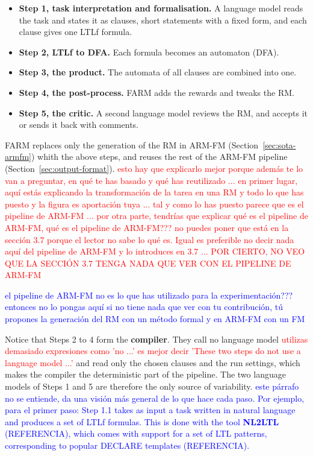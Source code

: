 \documentclass[11pt,english,listoffigures,listoftables]{tfgetsinf}
\begin{document}
\begin{itemize}
    \item \textbf{Step 1, task interpretation and formalisation.} A language model reads the task and states it as clauses, short statements with a fixed form, and each clause gives one LTLf formula.
    \item \textbf{Step 2, LTLf to DFA.} Each formula becomes an automaton (DFA).
    \item \textbf{Step 3, the product.} The automata of all clauses are combined into one.
    \item \textbf{Step 4, the post-process.} FARM adds the rewards and tweaks the RM.
    \item \textbf{Step 5, the critic.} A second language model reviews the RM, and accepts it or sends it back with comments.
\end{itemize}

FARM replaces only the generation of the RM in ARM-FM (Section~\ref{sec:sota-armfm}) whith the above steps, and reuses the rest of the ARM-FM pipeline (Section~\ref{sec:output-format}). \textcolor{red}{esto hay que explicarlo mejor porque además te lo van a preguntar, en qué te has basado y qué has reutilizado ... en primer lugar, aquí estás explicando la transformación de la tarea en una RM y todo lo que has puesto y la figura es aportación tuya ... tal y como lo has puesto parece que es el pipeline de ARM-FM ... por otra parte, tendrías que explicar qué es el pipeline de ARM-FM, qué es el pipeline de ARM-FM???  no puedes poner que está en la sección 3.7 porque el lector no sabe lo qué es. Igual es preferible no decir nada aquí del pipeline de ARM-FM y lo introduces en 3.7 ... POR CIERTO, NO VEO QUE LA SECCIÓN 3.7 TENGA NADA QUE VER CON EL PIPELINE DE ARM-FM}

\textcolor{blue}{el pipeline de ARM-FM no es lo que has utilizado para la experimentación??? entonces no lo pongas aquí si no tiene nada que ver con tu contribución, tú propones la generación del RM con un método formal y en ARM-FM con un FM}

Notice that Steps 2 to 4 form the \textbf{compiler}. They call no language model \textcolor{red}{utilizas demasiado expresiones como 'no ...' es mejor decir 'These two steps do not use a language model ...'} and read only the chosen clauses and the run settings, which makes the compiler the deterministic part of the pipeline. The two language models of Steps 1 and 5 are therefore the only source of variability. \textcolor{blue}{este párrafo no se entiende, da una visión más general de lo que hace cada paso. Por ejemplo, para el primer paso: Step 1.1 takes as input a task written in natural language and produces a set of LTLf formulas. This is done with the tool \textbf{NL2LTL} (REFERENCIA), which comes with support for a set of LTL patterns, corresponding to popular DECLARE templates (REFERENCIA).}
\end{document}
